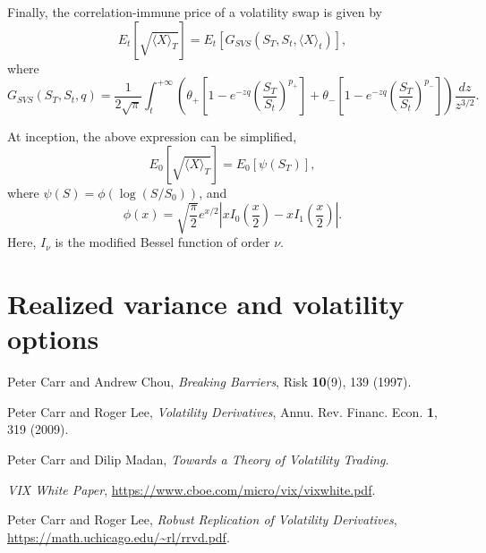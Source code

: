 \documentclass[12pt]{article}
\begin{document}
      Finally, the correlation-immune price of a volatility swap is given by
      \begin{equation}
        E_t\left[\sqrt{\langle X \rangle_T}\right] = E_t\left[G_{SVS}\left(S_T,S_t,\langle X \rangle_t\right)\right],
      \end{equation}
      where
      \begin{equation}
        G_{SVS}\left(S_T,S_t,q\right) = \frac{1}{2\sqrt{\pi}}\int_t^{+\infty}\left(\theta_+\left[1-e^{-zq}\left(\frac{S_T}{S_t}\right)^{p_+}\right]
                                                                                + \theta_-\left[1-e^{-zq}\left(\frac{S_T}{S_t}\right)^{p_-}\right]\right)\frac{dz}{z^{3/2}}.
      \end{equation}

      At inception, the above expression can be simplified,
      \begin{equation}
        E_0\left[\sqrt{\langle X \rangle_T}\right] = E_0\left[\psi(S_T)\right],
      \end{equation}
      where $\psi(S)=\phi(\log(S/S_0))$, and
      \begin{equation}
        \phi(x)=\sqrt{\frac{\pi}{2}}e^{x/2}\left|xI_0\left(\frac{x}{2}\right)-xI_1\left(\frac{x}{2}\right)\right|.
      \end{equation}
      Here, $I_{\nu}$ is the modified Bessel function of order $\nu$.

  \section{Realized variance and volatility options}


\begin{thebibliography}{99}
    Peter Carr and Andrew Chou, {\it Breaking Barriers}, Risk {\bf 10}(9), 139 (1997).

    Peter Carr and Roger Lee, {\it Volatility Derivatives}, Annu. Rev. Financ. Econ. {\bf 1}, 319 (2009).

    Peter Carr and Dilip Madan, {\it Towards a Theory of Volatility Trading}.

    {\it VIX White Paper}, \url{https://www.cboe.com/micro/vix/vixwhite.pdf}.

    Peter Carr and Roger Lee, {\it Robust Replication of Volatility Derivatives}, \url{https://math.uchicago.edu/~rl/rrvd.pdf}.

\end{thebibliography}
\end{document}
